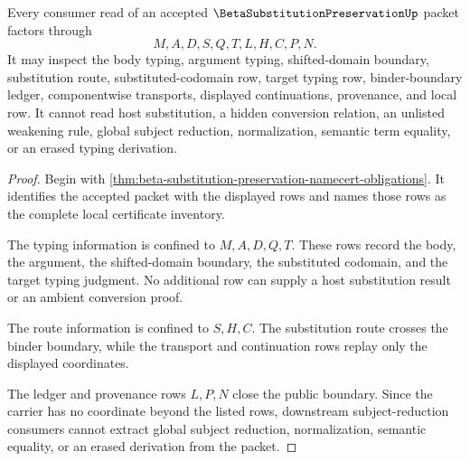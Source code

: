 \begin{theorem}
\label{thm:beta-substitution-preservation-ledger-nonescape}
Every consumer read of an accepted $\BetaSubstitutionPreservationUp$ packet factors through
$$
M,A,D,S,Q,T,L,H,C,P,N.
$$
It may inspect the body typing, argument typing, shifted-domain boundary, substitution route, substituted-codomain row, target typing row, binder-boundary ledger, componentwise transports, displayed continuations, provenance, and local \NameCert{} row. It cannot read host substitution, a hidden conversion relation, an unlisted weakening rule, global subject reduction, normalization, semantic term equality, or an erased typing derivation.
\end{theorem}
\begin{proof}
Begin with \autoref{thm:beta-substitution-preservation-namecert-obligations}. It identifies the accepted packet with the displayed rows and names those rows as the complete local certificate inventory.

The typing information is confined to $M,A,D,Q,T$. These rows record the body, the argument, the shifted-domain boundary, the substituted codomain, and the target typing judgment. No additional row can supply a host substitution result or an ambient conversion proof.

The route information is confined to $S,H,C$. The substitution route crosses the binder boundary, while the transport and continuation rows replay only the displayed coordinates.

The ledger and provenance rows $L,P,N$ close the public boundary. Since the carrier has no coordinate beyond the listed rows, downstream subject-reduction consumers cannot extract global subject reduction, normalization, semantic equality, or an erased derivation from the packet.
\end{proof}

